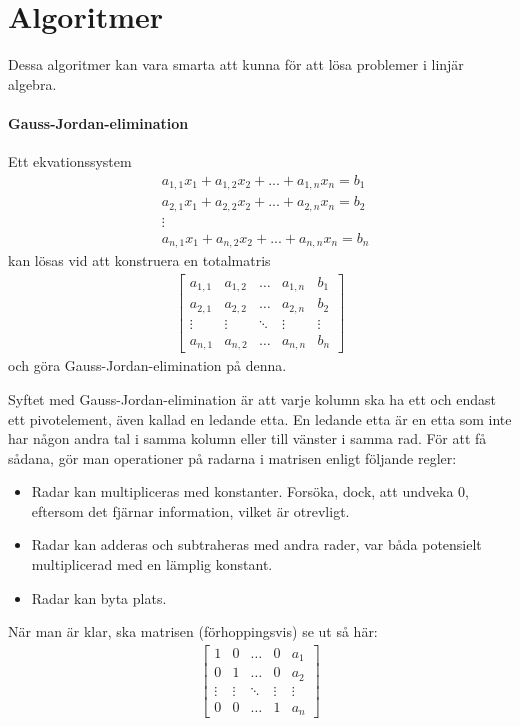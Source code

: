 \twocolumn

\section{Algoritmer}
Dessa algoritmer kan vara smarta att kunna för att lösa problemer i linjär algebra.

\paragraph{Gauss-Jordan-elimination}

Ett ekvationssystem
\begin{align*}
	& a_{1,1}x_1 + a_{1,2}x_2 + ... + a_{1,n}x_n = b_1 \\
	& a_{2,1}x_1 + a_{2,2}x_2 + ... + a_{2,n}x_n = b_2 \\
	& \vdots \\
	& a_{n,1}x_1 + a_{n,2}x_2 + ... + a_{n,n}x_n = b_n
\end{align*}
kan lösas vid att konstruera en totalmatris
\begin{align*}
	\left[\begin{array}{cccc|c}
    	a_{1,1} & a_{1,2} & \dots  & a_{1,n} & b_1 \\
    	a_{2,1} & a_{2,2} & \dots  & a_{2,n} & b_2 \\
    	\vdots  & \vdots  & \ddots & \vdots  & \vdots \\
	    a_{n,1} & a_{n,2} & \dots  & a_{n,n} & b_n
	\end{array}\right]
\end{align*}
och göra Gauss-Jordan-elimination på denna.

Syftet med Gauss-Jordan-elimination är att varje kolumn ska ha ett och endast ett pivotelement, även kallad en ledande etta. En ledande etta är en etta som inte har någon andra tal i samma kolumn eller till vänster i samma rad. För att få sådana, gör man operationer på radarna i matrisen enligt följande regler:
\begin{itemize}
	\item Radar kan multipliceras med konstanter. Forsöka, dock, att undveka $0$, eftersom det fjärnar information, vilket är otrevligt.
	\item Radar kan adderas och subtraheras med andra rader, var båda  potensielt multiplicerad med en lämplig konstant.
	\item Radar kan byta plats.
\end{itemize}

När man är klar, ska matrisen (förhoppingsvis) se ut så här:
\begin{align*}
	\left[\begin{array}{cccc|c}
    	1      & 0      & \dots  & 0      & a_1 \\
    	0      & 1      & \dots  & 0      & a_2 \\
    	\vdots & \vdots & \ddots & \vdots & \vdots \\
	    0      & 0      & \dots  & 1      & a_n
	\end{array}\right]
\end{align*}